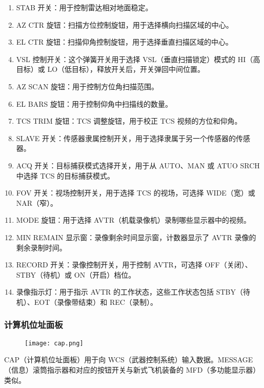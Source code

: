 \begin{enumerate}
  \item STAB 开关：用于控制雷达相对地面稳定。
  \item AZ CTR 旋钮：扫描方位控制旋钮，用于选择横向扫描区域的中心。
  \item EL CTR 旋钮：扫描仰角控制旋钮，用于选择垂直扫描区域的中心。
  \item VSL 控制开关：这个弹簧开关用于选择 VSL（垂直扫描锁定）模式的 HI（高目标）或 LO（低目标），释放开关后，开关弹回中间位置。
  \item AZ SCAN 旋钮：用于控制方位角扫描范围。
  \item EL BARS 旋钮：用于控制仰角中扫描线的数量。
  \item TCS TRIM 旋钮：TCS 调整旋钮，用于校正 TCS 视频的方位和仰角。
  \item SLAVE 开关：传感器隶属控制开关，用于选择隶属于另一个传感器的传感器。
  \item ACQ 开关：目标捕获模式选择开关，用于从 AUTO、MAN 或 ATUO SRCH 中选择 TCS 的目标捕获模式。
  \item FOV 开关：视场控制开关，用于选择 TCS 的视场，可选择 WIDE（宽）或 NAR（窄）。
  \item MODE 旋钮：用于选择 AVTR（机载录像机）录制哪些显示器中的视频。
  \item MIN REMAIN 显示窗：录像剩余时间显示窗，计数器显示了 AVTR 录像的剩余录制时间。
  \item RECORD 开关：录像控制开关，用于控制 AVTR，可选择 OFF（关闭）、STBY（待机）或 ON（开启）档位。
  \item 录像指示灯：用于指示 AVTR 的工作状态，这些工作状态包括 STBY（待机）、EOT（录像带结束）和 REC（录制）。
\end{enumerate}

\subsubsection{计算机位址面板}
\begin{figure}[htb]
  \center
  \texttt{[image: cap.png]}
\end{figure}
CAP（计算机位址面板）用于向 WCS（武器控制系统）输入数据。MESSAGE（信息）滚筒指示器和对应的按钮开关与新式飞机装备的 MFD（多功能显示器）类似。

